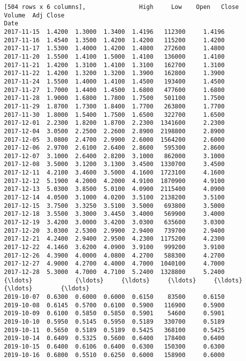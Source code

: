 \documentclass[11pt]{article}
\begin{document}
\begin{Verbatim}[commandchars=\\\{\}]
[504 rows x 6 columns],               High     Low    Open   Close   Volume  Adj Close
Date                                                          
2017-11-15  1.4200  1.3000  1.3400  1.4196   112300     1.4196
2017-11-16  1.4540  1.3500  1.4200  1.4200   115200     1.4200
2017-11-17  1.5300  1.4000  1.4200  1.4800   272600     1.4800
2017-11-20  1.5500  1.4100  1.5000  1.4100   136000     1.4100
2017-11-21  1.4200  1.3100  1.4100  1.3100   162700     1.3100
2017-11-22  1.4200  1.3200  1.3200  1.3900   162800     1.3900
2017-11-24  1.5500  1.4000  1.4100  1.4500   193400     1.4500
2017-11-27  1.7000  1.4400  1.4500  1.6800   477600     1.6800
2017-11-28  1.9000  1.6800  1.7800  1.7500   501100     1.7500
2017-11-29  1.8700  1.7300  1.8400  1.7700   263800     1.7700
2017-11-30  1.8000  1.5400  1.7500  1.6500   322700     1.6500
2017-12-01  2.2300  1.8200  1.8700  2.2300  1341600     2.2300
2017-12-04  3.0500  2.2500  2.2600  2.8900  2198800     2.8900
2017-12-05  3.0800  2.4700  2.9900  2.6000  1564200     2.6000
2017-12-06  2.9700  2.6100  2.6400  2.8600   595300     2.8600
2017-12-07  3.1000  2.6400  2.8200  3.1000   862000     3.1000
2017-12-08  3.5000  3.1200  3.1300  3.4500  1330700     3.4500
2017-12-11  4.2100  3.4600  3.5000  4.1600  1723100     4.1600
2017-12-12  5.1900  4.2000  4.2000  4.9100  1870900     4.9100
2017-12-13  5.0300  3.8500  5.0100  4.0900  2115400     4.0900
2017-12-14  4.0500  3.1000  4.0200  3.5100  2138200     3.5100
2017-12-15  3.7500  3.3250  3.5100  3.5000   693800     3.5000
2017-12-18  3.5500  3.3000  3.4450  3.4000   569900     3.4000
2017-12-19  3.4200  3.0000  3.4200  3.0300   635600     3.0300
2017-12-20  3.0300  2.5300  2.9900  2.9400   739700     2.9400
2017-12-21  4.2400  2.9400  2.9500  4.2300  1175200     4.2300
2017-12-22  4.1460  3.6200  4.0900  3.9100   999200     3.9100
2017-12-26  4.3900  4.0000  4.0800  4.2700   588300     4.2700
2017-12-27  4.9000  4.2700  4.4000  4.7000  1040100     4.7000
2017-12-28  5.3000  4.7000  4.7100  5.2400  1328800     5.2400
{\ldots}            {\ldots}     {\ldots}     {\ldots}     {\ldots}      {\ldots}        {\ldots}
2019-10-07  0.6300  0.6000  0.6000  0.6150    83500     0.6150
2019-10-08  0.6145  0.5700  0.6100  0.5900   116900     0.5900
2019-10-09  0.6100  0.5850  0.5850  0.5901    54600     0.5901
2019-10-10  0.5950  0.5145  0.5950  0.5189   330700     0.5189
2019-10-11  0.5650  0.5189  0.5189  0.5425   368100     0.5425
2019-10-14  0.6409  0.5325  0.5600  0.6400   178400     0.6400
2019-10-15  0.6400  0.6106  0.6400  0.6300   150300     0.6300
2019-10-16  0.6800  0.5510  0.6250  0.6000   158900     0.6000

\end{Verbatim}
\end{document}
